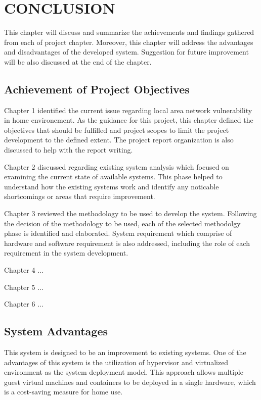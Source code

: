 \documentclass[../index.tex]{subfiles}
\begin{document}
\chapter{CONCLUSION}

This chapter will discuss and summarize the achievements and findings gathered from each of project
chapter. Moreover, this chapter will address the advantages and disadvantages of the developed
system. Suggestion for future improvement will be also discussed at the end of the chapter.

\section{Achievement of Project Objectives}

Chapter 1 identified the current issue regarding local area network vulnerability in home
environement. As the guidance for this project, this chapter defined the objectives that should be
fulfilled and project scopes to limit the project development to the defined extent. The project
report organization is also discussed to help with the report writing.

Chapter 2 discussed regarding existing system analysis which focused on examining the current state of
available systems. This phase helped to understand how the existing systems work and identify any
noticable shortcomings or areas that require improvement.

Chapter 3 reviewed the methodology to be used to develop the system. Following the decision of the
methodology to be used, each of the selected methodolgy phase is identified and elaborated. System
requirement which comprise of hardware and software requirement is also addressed, including the
role of each requirement in the system development.

Chapter 4 ...

Chapter 5 ...

Chapter 6 ...

\section{System Advantages}

This system is designed to be an improvement to existing systems. One of the advantages of this
system is the utilization of hypervisor and virtualized environment as the system deployment model.
This approach allows multiple guest virtual machines and containers to be deployed in a single
hardware, which is a cost-saving measure for home use.
\end{document}
